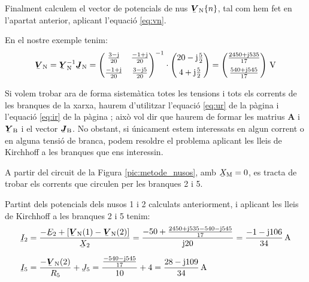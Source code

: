 Finalment
calculem el vector de potencials de nus $\mcmplx{V}\ped{N}\{n\}$, tal
com  hem fet en l'apartat anterior, aplicant l'equació \eqref{eq:vn}.

En el nostre exemple tenim:
\[
   \mcmplx{V}\ped{N} = \mcmplx{Y}\ped{N}^{-1} \mcmplx{J}\ped{N} =
   \begin{pmatrix}
         \frac{3 - \ju}{20}  & \frac{-1 + \ju}{20} \\[2mm]
         \frac{-1 + \ju}{20} & \frac{3 - \ju 5}{20}
   \end{pmatrix} ^{-1} \cdot
   \begin{pmatrix}
            20 - \ju \frac{5}{2} \\[2mm]
            4 + \ju \frac{5}{2}
   \end{pmatrix} =
   \begin{pmatrix}
         \frac{2450 + \ju 535}{17} \\[2mm]
         \frac{540  + \ju 545}{17}
   \end{pmatrix}\si{\,V}
\]

Si volem trobar ara de forma sistemàtica totes les tensions i tots
els corrents   de les branques de la xarxa, haurem d'utilitzar
l'equació \eqref{eq:ur} de la pàgina \pageref{eq:ur} i l'equació
\eqref{eq:ir} de la pàgina \pageref{eq:ir}; això vol dir que haurem
de formar les matrius $\boldsymbol{A}$ i $\mcmplx{Y}\ped{B}$ i el
vector $\mcmplx{J}\ped{B}$. No obstant, si únicament estem
interessats en algun corrent o en alguna tensió de branca, podem
resoldre el problema aplicant les lleis de Kirchhoff a les branques
que ens interessin.


\begin{exemple}
    A partir del circuit de la Figura \vref{pic:metode_nusos}, amb
    $\cmplx{X}\ped{M}=0$, es tracta de trobar els corrents que circulen
    per les branques 2 i 5.

    Partint dels potencials dels nusos 1 i 2 calculats anteriorment, i
    aplicant les lleis de Kirchhoff a les branques 2 i 5 tenim:
    \begin{align*}
       \cmplx{I}_2 &= \frac{-\cmplx{E}_2 + [\mcmplx{V}\ped{N}(1) - \mcmplx{V}\ped{N}(2)]}
                      {\cmplx{X}_2} = \frac{-50 + \frac{2450+\ju 535 -540
                      - \ju 545}{17}} {\ju 20} = \frac{-1 - \ju 106}{34}\si{\,A} \\[1.5ex]
       \cmplx{I}_5 &=  \frac{- \mcmplx{V}\ped{N}(2)}{R_5}  + \cmplx{J}_5 =
                      \frac{\frac{-540 - \ju 545}{17}}{10} + 4 =
                      \frac{28 - \ju 109}{34}\si{\,A}
    \end{align*}
\end{exemple}

